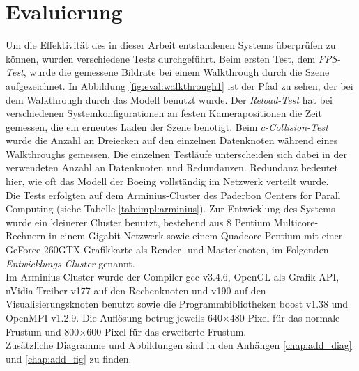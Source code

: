 \chapter{Evaluierung}
\label{chap:eval}
%

Um die Effektivität des in dieser Arbeit entstandenen Systems überprüfen zu können, wurden verschiedene Tests durchgeführt.
Beim ersten Test, dem \textit{FPS-Test}, wurde die gemessene Bildrate bei einem Walkthrough durch die Szene aufgezeichnet. In Abbildung \ref{fig:eval:walkthrough1} ist der Pfad zu sehen, der bei dem Walkthrough durch das Modell benutzt wurde. Der \textit{Reload-Test} hat bei verschiedenen Systemkonfigurationen an festen Kamerapositionen die Zeit gemessen, die ein erneutes Laden der Szene benötigt. Beim \textit{$c$-Collision-Test} wurde die Anzahl an Dreiecken auf den einzelnen Datenknoten während eines Walkthroughs gemessen. Die einzelnen Testläufe unterscheiden sich dabei in der verwendeten Anzahl an Datenknoten und Redundanzen. Redundanz bedeutet hier, wie oft das Modell der Boeing vollständig im Netzwerk verteilt wurde. \\
Die Tests erfolgten auf dem Arminius-Cluster des Paderbon Centers for Parall Computing (siehe Tabelle \ref{tab:impl:arminius}). Zur Entwicklung des Systems wurde ein kleinerer Cluster benutzt, bestehend aus 8 Pentium Multicore-Rechnern in einem Gigabit Netzwerk sowie einem Quadcore-Pentium mit einer GeForce 260GTX Grafikkarte als Render- und Masterknoten, im Folgenden \textit{Entwicklungs-Cluster} genannt.\\
Im Arminius-Cluster wurde der Compiler gcc v3.4.6, OpenGL als Grafik-API, nVidia Treiber v177 auf den Rechenknoten und v190 auf den Visualisierungsknoten benutzt sowie die Programmbibliotheken boost v1.38 und OpenMPI v1.2.9. Die Auflösung betrug jeweils 640$\times$480 Pixel für das normale Frustum und 800$\times$600 Pixel für das erweiterte Frustum.\\
Zusätzliche Diagramme und Abbildungen sind in den Anhängen \ref{chap:add_diag} und \ref{chap:add_fig} zu finden.
